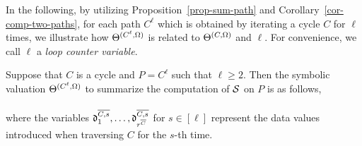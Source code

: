 In the following, by utilizing Proposition~\ref{prop-sum-path} and Corollary~\ref{cor-comp-two-paths}, for each path $C^{\ell}$ which is obtained by iterating a cycle $C$ for $\ell$ times, we illustrate how $\Theta^{(C^\ell,\Omega)}$ is related to $\Theta^{(C, \Omega)}$ and $\ell$. For convenience, we call $\ell$ a \emph{loop counter variable}.

\begin{proposition}\label{prop-sum-cycle}
Suppose that $C$ is a cycle and $P=C^{\ell}$ such that $\ell \ge 2$. Then the symbolic valuation $\Theta^{(C^\ell,\Omega)}$ to summarize the computation of ${\mathcal{S} }$ on $P$ is as follows,\medskip\\
\medskip\\
where the variables $\mathfrak{d}^{\overline{C , s}}_{1},\dots, \mathfrak{d}^{\overline{C ,s}}_{r^{\overline{C}}}$ for $s\in [\ell]$
 represent the data values introduced when traversing $C$ for the $s$-th time.
\end{proposition}

